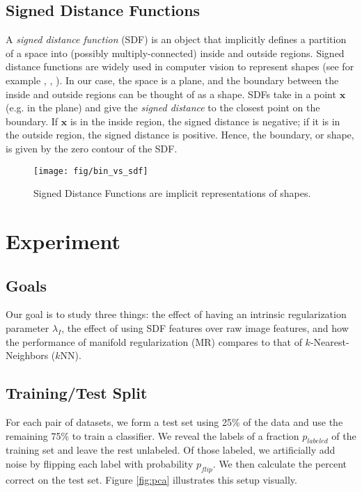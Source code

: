 \documentclass[anon,11pt]{9520} %
\newcommand{\mb}{\mathbf}
\begin{document}
\subsection{Signed Distance Functions} 
A {\em signed distance function} (SDF) is an object that implicitly defines a
partition of a space into (possibly multiply-connected) inside and outside
regions. Signed distance functions are widely used in computer vision to
represent shapes (see for example \cite{sdf}, \cite{Tsai1}, \cite{Tsai2}). In our case, the space is a plane,
and the boundary between the inside and outside regions can be thought of as a
shape. SDFs take in a point $\mb{x}$ (e.g. in the plane) and give the {\em
  signed distance} to the closest point on the boundary. If $\mb{x}$ is in the
inside region, the signed distance is negative; if it is in the outside region,
the signed distance is positive. Hence, the boundary, or shape, is given by the
zero contour of the SDF.
\begin{figure}[h!]
\begin{center}
\texttt{[image: fig/bin\_vs\_sdf]}
\end{center}
\caption{\label{fig:bin_vs_sdf} Signed Distance Functions are implicit representations of shapes.}
\end{figure}

\section{Experiment}
\subsection{Goals}
\label{sec:goals}
Our goal is to study three things: the effect of having an intrinsic
regularization parameter $\lambda_I$, the effect of using SDF features over raw
image features, and how the performance of manifold regularization (MR) compares
to that of $k$-Nearest-Neighbors ($k$NN).

\subsection{Training/Test Split}
For each pair of datasets, we form a test set using 25\% of the data and use the
remaining 75\% to train a classifier. We reveal the labels of a fraction
$p_{labeled}$ of the training set and leave the rest unlabeled. Of those
labeled, we artificially add noise by flipping each label with probability
$p_{flip}$. We then calculate the percent correct on the test set. Figure \ref{fig:pca} illustrates this setup visually.
\end{document}
